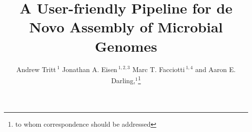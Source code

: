 \documentclass{bioinfo}
\begin{document}

\title[a5]{A User-friendly Pipeline for de Novo Assembly of Microbial Genomes}
\author[Tritt \textit{et~al}]{Andrew Tritt\,$^{1}$ Jonathan A. Eisen\,$^{1,2,3}$ Marc T. Facciotti\,$^{1,4}$ and Aaron E. Darling,$^{1}$\footnote{to whom correspondence should be addressed}}
\address{$^{1}$Genome Center, $^{2}$ Dept. of Evolution and Ecology, $^{3}$ Medical Microbiology and Immunology, 
$^{4}$ Biomedical Engineering, University of California-Davis, Davis, CA 95616.}



\maketitle
\end{document}
